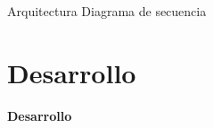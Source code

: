 \begin{frame}{Arquitectura}
    \vspace{0cm} {Diagrama de secuencia}
    \vspace{0.5cm}
    \begin{figure}[ht]
       \centering
       \vspace{-0.50cm}
    \end{figure}

\end{frame}



\section{Desarrollo}
\begin{frame}
    \Huge
    \centering
    \textbf{Desarrollo}

\end{frame}


